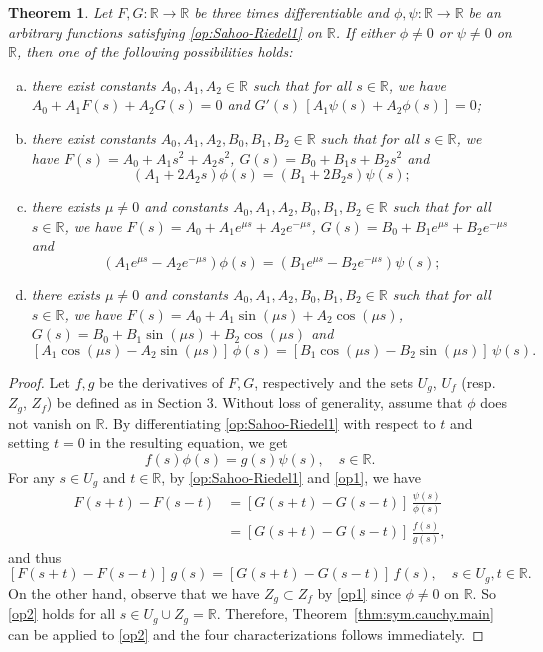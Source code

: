 \documentclass{birkjour}
\newtheorem{theorem}{Theorem}
\begin{document}
\begin{theorem}
Let $F,G:{{\mathbb R}}\to{{\mathbb R}}$ be three times differentiable and $\phi,\psi:{{\mathbb R}}\to{{\mathbb R}}$ be an arbitrary functions satisfying \eqref{op:Sahoo-Riedel1} on ${{\mathbb R}}$. If either $\phi\neq0$ or $\psi\neq0$ on ${{\mathbb R}}$, then one of the following possibilities holds:
\begin{enumerate}[(a)]
\item there exist constants $A_0,A_1,A_2\in{{\mathbb R}}$ such that for all $s\in{{\mathbb R}}$, we have $A_0+A_1F(s)+A_2G(s)=0$ and $G'(s)\,[A_1\psi(s)+A_2\phi(s)]=0$;
\item there exist constants $A_0,A_1,A_2,B_0,B_1,B_2\in{{\mathbb R}}$ such that for all $s\in{{\mathbb R}}$, we have $F(s)=A_0+A_1s^2+A_2s^2$, $G(s)=B_0+B_1s+B_2s^2$ and 
\[
(A_1+2A_2s)\phi(s)=(B_1+2B_2s)\psi(s);
\]
\item there exists $\mu\neq0$ and constants $A_0,A_1,A_2,B_0,B_1,B_2\in{{\mathbb R}}$ such that for all $s\in{{\mathbb R}}$, we have $F(s)=A_0+A_1e^{\mu s}+A_2e^{-\mu s}$, $G(s)=B_0+B_1e^{\mu s}+B_2e^{-\mu s}$ and 
\[
(A_1e^{\mu s}-A_2e^{-\mu s})\phi(s) = (B_1e^{\mu s}-B_2e^{-\mu s})\psi(s); 
\]
\item there exists $\mu\neq0$ and constants $A_0,A_1,A_2,B_0,B_1,B_2\in{{\mathbb R}}$ such that for all $s\in{{\mathbb R}}$, we have $F(s)=A_0+A_1\sin(\mu s)+A_2\cos(\mu s)$, $G(s)=B_0+B_1\sin(\mu s)+B_2\cos(\mu s)$ and 
\[
[A_1\cos(\mu s)-A_2\sin(\mu s)]\,\phi(s) = [B_1\cos(\mu s)-B_2\sin(\mu s)]\,\psi(s). 
\]
\end{enumerate} 
\end{theorem}
\begin{proof}
Let $f,g$ be the derivatives of $F,G$, respectively and the sets $U_g$, $U_f$ (resp. $Z_g$, $Z_f$) be defined as in Section 3. Without loss of generality, assume that $\phi$ does not vanish on ${{\mathbb R}}$. By differentiating \eqref{op:Sahoo-Riedel1} with respect to $t$ and setting $t=0$ in the resulting equation, we get 
\begin{equation}
\label{op1}
f(s)\phi(s) = g(s)\psi(s), \quad s\in{{\mathbb R}}.
\end{equation}
For any $s\in U_g$ and $t\in{{\mathbb R}}$, by \eqref{op:Sahoo-Riedel1} and \eqref{op1}, we have
\begin{align*}
F(s+t)-F(s-t) &= [G(s+t)-G(s-t)]\,\frac{\psi(s)}{\phi(s)}\\
              &= [G(s+t)-G(s-t)]\,\frac{f(s)}{g(s)},
\end{align*}
and thus
\begin{equation}
\label{op2}
[F(s+t)-F(s-t)]\, g(s) = [G(s+t)-G(s-t)]\,f(s), \quad s\in U_g, t\in{{\mathbb R}}. 
\end{equation}
On the other hand, observe that we have $Z_g\subset Z_f$ by \eqref{op1} since $\phi\neq0$ on ${{\mathbb R}}$. So \eqref{op2} holds for all $s\in U_g\cup Z_g={{\mathbb R}}$. Therefore, Theorem~\eqref{thm:sym.cauchy.main} can be applied to \eqref{op2} and the four characterizations follows immediately. 
\end{proof}
\end{document}

